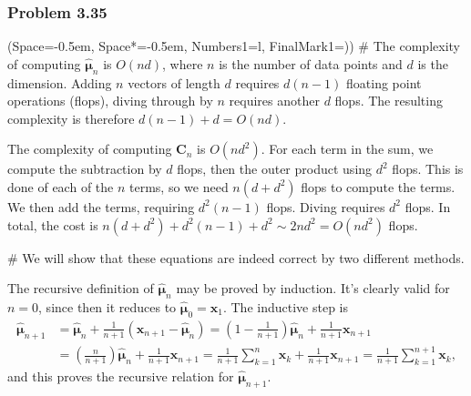 \documentclass[12pt, a4paper]{article}
\newcommand{\listSpace}{-0.5em}%
\newcommand{\vect}[1]{\bm{#1}}
\begin{document}
\subsubsection*{Problem 3.35}
\begin{easylist}[enumerate]
	\ListProperties(Space=\listSpace, Space*=\listSpace, Numbers1=l, FinalMark1={)})
	# The complexity of computing $\hat{\vect{\mu}}_n$ is $O\left(nd\right)$, where $n$ is the number of data points and $d$ is the dimension.
	Adding $n$ vectors of length $d$ requires $d(n-1)$ floating point operations (flops), diving through by $n$ requires another $d$ flops.
	The resulting complexity is therefore $d(n-1) + d = O(nd)$.
	
	The complexity of computing $\vect{C}_n$ is $O\left(nd^2\right)$.
	For each term in the sum, we compute the subtraction by $d$ flops, then the outer product using $d^2$ flops.
	This is done of each of the $n$ terms, so we need $n(d + d^2)$ flops to compute the terms.
	We then add the terms, requiring $d^2(n-1)$ flops.
	Diving requires $d^2$ flops.
	In total, the cost is $n(d + d^2) + d^2(n-1) + d^2 \sim 2nd^2 = O(nd^2)$ flops.
	
	# We will show that these equations are indeed correct by two different methods.
	
	
	The recursive definition of $\hat{\vect{\mu}}_n$ may be proved by induction.
	It's clearly valid for $n=0$, since then it reduces to $\hat{\vect{\mu}}_0 = \vect{x}_1$.
	The inductive step is
	\begin{align*}
	\hat{\vect{\mu}}_{n+1} &= \hat{\vect{\mu}}_{n} +  \frac{1}{n +1} \left( \vect{x}_{n+1} -  \hat{\vect{\mu}}_{n} \right)
	= 
	\left(1 - \frac{1}{n+1}\right) \hat{\vect{\mu}}_{n}  + \frac{1}{n + 1} \vect{x}_{n+1} \\
	&= 
	\left(\frac{n}{n+1}\right) \hat{\vect{\mu}}_{n}  + \frac{1}{n + 1} \vect{x}_{n+1} = 
	\frac{1}{n+1} \sum_{k=1}^{n} \vect{x}_{k} + \frac{1}{n+1} \vect{x}_{n+1}
	= \frac{1}{n+1} \sum_{k=1}^{n+1} \vect{x}_{k},
	\end{align*}
	and this proves the recursive relation for $\hat{\vect{\mu}}_{n+1}$.
	

\end{easylist}
\end{document}
